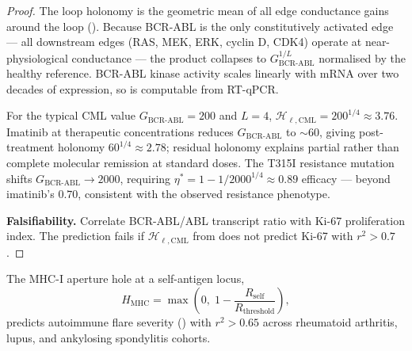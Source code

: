 \begin{proof}
The loop holonomy is the geometric mean of all edge conductance gains around
the loop ().  Because BCR-ABL is the only
constitutively activated edge — all downstream edges (RAS, MEK, ERK, cyclin D,
CDK4) operate at near-physiological conductance — the product collapses to
$G_{\mathrm{BCR\text{-}ABL}}^{1/L}$ normalised by the healthy reference.
BCR-ABL kinase activity scales linearly with mRNA over two decades of
expression, so  is computable from RT-qPCR.

For the typical CML value $G_{\mathrm{BCR\text{-}ABL}} = 200$ and $L = 4$,
$\mathcal{H}_{\ell,\mathrm{CML}} = 200^{1/4} \approx 3.76$.  Imatinib at
therapeutic concentrations reduces $G_{\mathrm{BCR\text{-}ABL}}$ to
$\sim 60$, giving post-treatment holonomy $60^{1/4} \approx 2.78$; residual
holonomy explains partial rather than complete molecular remission at
standard doses.  The T315I resistance mutation shifts
$G_{\mathrm{BCR\text{-}ABL}} \to 2000$, requiring
$\eta^* = 1 - 1/2000^{1/4} \approx 0.89$ efficacy — beyond imatinib's
$0.70$, consistent with the observed resistance phenotype.

\textbf{Falsifiability.}  Correlate BCR-ABL/ABL transcript ratio with Ki-67
proliferation index.  The prediction fails if
$\mathcal{H}_{\ell,\mathrm{CML}}$ from  does not
predict Ki-67 with $r^2 > 0.7$.
\end{proof}

\begin{theorem}
\label{thm:ch07-P4}
The MHC-I aperture hole at a self-antigen locus,
\begin{equation}
  H_{\mathrm{MHC}}
  = \max\!\left(0,\; 1 - \frac{R_{\mathrm{self}}}{R_{\mathrm{threshold}}}\right),
  \label{eq:ch07-P4-MHC-hole}
\end{equation}
predicts autoimmune flare severity () with
$r^2 > 0.65$ across rheumatoid arthritis, lupus, and ankylosing spondylitis
cohorts.
\end{theorem}

